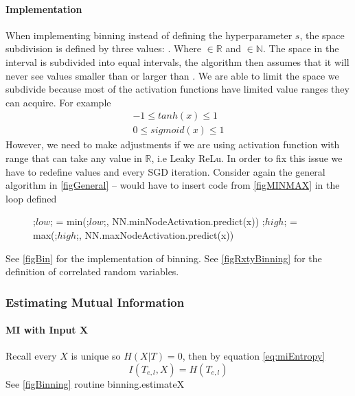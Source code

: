 \documentclass[dissertation.tex]{subfiles}
\begin{document}
\paragraph{Implementation} When implementing binning instead of defining the
hyperparameter $s$, the space subdivision is defined by three values:
. Where 
$\in{\mathbb{R}}$ and
$\in{\mathbb{N}}$.
The space in the interval  is subdivided into
 equal intervals, the algorithm then assumes that it will never
see values smaller than  or larger than .     We
are able to limit the space we subdivide because most of the activation
functions have limited value ranges they can acquire. For example
\begin{gather}
  -1 \leq tanh(x) \leq 1\\
  0 \leq sigmoid(x) \leq 1
\end{gather}
However, we need to make adjustments if we are using activation function with
range that can take any value in $\mathbb{R}$, i.e Leaky ReLu. In order to fix
this issue we have to redefine values  and  every
SGD iteration. Consider again the general algorithm in \autoref{figGeneral} --
would have to insert code from \autoref{figMINMAX} in the loop defined
\begin{figure}[H]
  \begin{pythonfigure}
        ;$low$; = min(;$low$;, NN.minNodeActivation.predict(x))
        ;$high$; = max(;$high$;, NN.maxNodeActivation.predict(x))
  \end{pythonfigure}
  \label{figMINMAX}
\end{figure}
See \autoref{figBin} for the implementation of binning. See
\autoref{figRxtyBinning} for the definition of correlated random variables.

\subsubsection{Estimating Mutual Information}

\paragraph{MI with Input X}
Recall every $X$ is unique so $H(X|T)=0$, then by equation
\autoref{eq:miEntropy}
\begin{equation}
  I(T_{e,l}, X) = H(T_{e,l})
\end{equation}
See \autoref{figBinning} routine binning.estimateX
\end{document}
